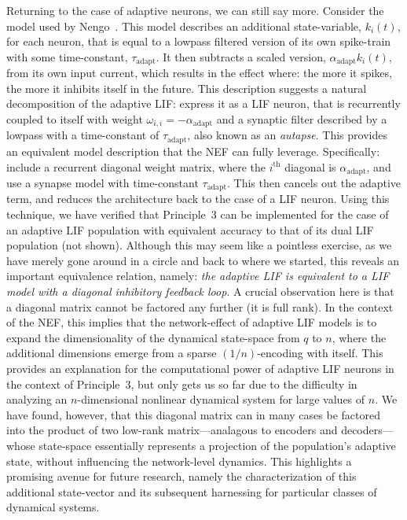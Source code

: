 Returning to the case of adaptive neurons, we can still say more.
Consider the model used by Nengo~\citep{camera2004minimal}.
This model describes an additional state-variable, $k_i(t)$, for each neuron, that is equal to a lowpass filtered version of its own spike-train with some time-constant, $\tau_\text{adapt}$.
It then subtracts a scaled version, $\alpha_\text{adapt} k_i(t)$, from its own input current, which results in the effect where: the more it spikes, the more it inhibits itself in the future.
This description suggests a natural decomposition of the adaptive LIF: express it as a LIF neuron, that is recurrently coupled to itself with weight $\omega_{i,i} = -\alpha_\text{adapt}$ and a synaptic filter described by a lowpass with a time-constant of $\tau_\text{adapt}$, also known as an \emph{autapse}.
This provides an equivalent model description that the NEF can fully leverage.
Specifically: include a recurrent diagonal weight matrix, where the $i^\text{th}$ diagonal is $\alpha_\text{adapt}$, and use a synapse model with time-constant $\tau_\text{adapt}$.
This then cancels out the adaptive term, and reduces the architecture back to the case of a LIF neuron.
Using this technique, we have verified that Principle~3 can be implemented for the case of an adaptive LIF population with equivalent accuracy to that of its dual LIF population (not shown).
Although this may seem like a pointless exercise, as we have merely gone around in a circle and back to where we started, this reveals an important equivalence relation, namely:
\emph{the adaptive LIF is equivalent to a LIF model with a diagonal inhibitory feedback loop}.
A crucial observation here is that a diagonal matrix cannot be factored any further (it is full rank).
In the context of the NEF, this implies that the network-effect of adaptive LIF models is to expand the dimensionality of the dynamical state-space from $q$ to $n$, where the additional dimensions emerge from a sparse $(1/n)$-encoding with itself.
This provides an explanation for the computational power of adaptive LIF neurons in the context of Principle~3, but only gets us so far due to the difficulty in analyzing an $n$-dimensional nonlinear dynamical system for large values of $n$.
We have found, however, that this diagonal matrix can in many cases be factored into the product of two low-rank matrix---analagous to encoders and decoders---whose state-space essentially represents a projection of the population's adaptive state, without influencing the network-level dynamics.
This highlights a promising avenue for future research, namely the characterization of this additional state-vector and its subsequent harnessing for particular classes of dynamical systems.

